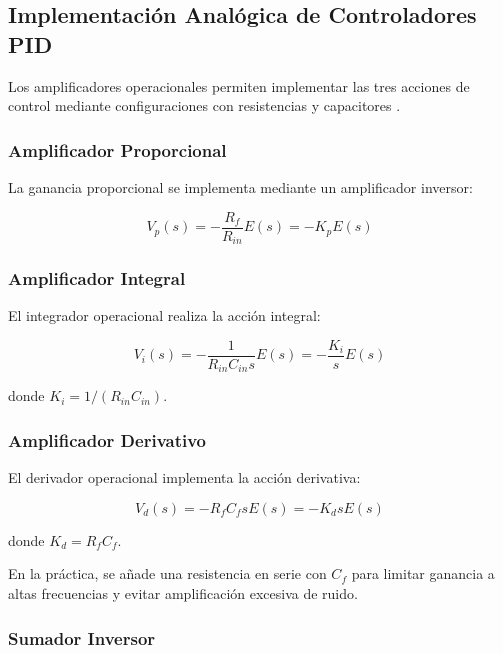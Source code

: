 \documentclass[conference]{IEEEtran}
\begin{document}
\subsection{Implementación Analógica de Controladores PID}

Los amplificadores operacionales permiten implementar las tres acciones de control mediante configuraciones con resistencias y capacitores \cite{sedra}.

\subsubsection{Amplificador Proporcional}

La ganancia proporcional se implementa mediante un amplificador inversor:

\begin{equation}
V_p(s) = -\frac{R_f}{R_{in}} E(s) = -K_p E(s)
\label{eq:amp_prop}
\end{equation}

\subsubsection{Amplificador Integral}

El integrador operacional realiza la acción integral:

\begin{equation}
V_i(s) = -\frac{1}{R_{in}C_{in}s} E(s) = -\frac{K_i}{s} E(s)
\label{eq:amp_int}
\end{equation}

donde $K_i = 1/(R_{in}C_{in})$.

\subsubsection{Amplificador Derivativo}

El derivador operacional implementa la acción derivativa:

\begin{equation}
V_d(s) = -R_f C_f s E(s) = -K_d s E(s)
\label{eq:amp_der}
\end{equation}

donde $K_d = R_f C_f$.

En la práctica, se añade una resistencia en serie con $C_f$ para limitar ganancia a altas frecuencias y evitar amplificación excesiva de ruido.

\subsubsection{Sumador Inversor}
\end{document}
